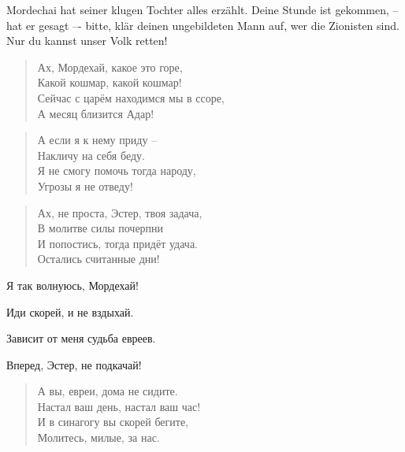 \documentclass[12pt,a4paper,titlepage]{article}
\begin{document}
\begin{drama}
\uespeaks
Mordechai hat seiner klugen Tochter alles erzählt. Deine Stunde
ist gekommen, -- hat er gesagt –- bitte, klär deinen ungebildeten Mann auf,
wer die Zionisten sind. Nur du kannst unser Volk retten!

\espeaks {}
\begin{verse}
Ах, Мордехай, какое это горе,\\
Какой кошмар, какой кошмар!\\
Сейчас с царём находимся мы в ссоре,\\
А месяц близится Адар!\\
\end{verse}

\begin{verse}
А если я к нему приду --\\
Накличу на себя беду.\\
Я не смогу помочь тогда народу,\\
Угрозы я не отведу!\\
\end{verse}


\mspeaks {}
\begin{verse}
Ах, не проста, Эстер, твоя задача,\\
В молитве силы почерпни\\
И попостись, тогда придёт удача.\\
Остались считанные дни!\\
\end{verse}

Я так волнуюсь, Мордехай!

Иди скорей, и не вздыхай.

Зависит от меня судьба евреев.

Вперед, Эстер, не подкачай!


\mspeaks {}
\begin{verse}
А вы, евреи, дома не сидите.\\
Настал ваш день, настал ваш час!\\
И в синагогу вы скорей бегите,\\
Молитесь, милые, за нас.\\
\end{verse}




\end{drama}
\end{document}
